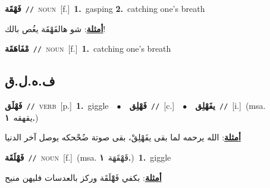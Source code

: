 \documentclass[10pt,a4paper,twoside]{article} %
\begin{document}
\begin{multicols}{2}
{\setlength\topsep{0pt}\textbf{\foreignlanguage{arabic}{فَهْقَة}}\ {\color{gray}\texttt{//}\color{black}}\ \textsc{noun}\ [f.]\ \textbf{1.}~gasping  \textbf{2.}~catching one's breath\  \begin{flushright}\color{gray}\foreignlanguage{arabic}{\textbf{\underline{\foreignlanguage{arabic}{أمثلة}}}: شو هالفَهْقَة يغُص بالك!}\end{flushright}\color{black}} \vspace{2mm}

{\setlength\topsep{0pt}\textbf{\foreignlanguage{arabic}{مْفَاهَقَة}}\ {\color{gray}\texttt{//}\color{black}}\ \textsc{noun}\ [f.]\ \textbf{1.}~catching one's breath\ } \vspace{2mm}

\vspace{-3mm}
\subsection*{\color{blue}\foreignlanguage{arabic}{ف.ه.ل.ق}\color{blue}{}} 

{\setlength\topsep{0pt}\textbf{\foreignlanguage{arabic}{فَهْلَق}}\ {\color{gray}\texttt{//}\color{black}}\ \textsc{verb}\ [p.]\ \textbf{1.}~giggle\ \ $\bullet$\ \ \setlength\topsep{0pt}\textbf{\foreignlanguage{arabic}{فَهْلِق}}\ {\color{gray}\texttt{//}\color{black}}\ [c.]\ \ $\bullet$\ \ \setlength\topsep{0pt}\textbf{\foreignlanguage{arabic}{يفَهْلِق}}\ {\color{gray}\texttt{//}\color{black}}\ [i.]\ \color{gray}(msa. \foreignlanguage{arabic}{يقهقه}~\foreignlanguage{arabic}{\textbf{١.}})\color{black}\  \begin{flushright}\color{gray}\foreignlanguage{arabic}{\textbf{\underline{\foreignlanguage{arabic}{أمثلة}}}: الله يرحمه لما بقى يفَهْلِقْ، بقى صوتة ضُحْحكه يوصل آخر الدنيا}\end{flushright}\color{black}} \vspace{2mm}

{\setlength\topsep{0pt}\textbf{\foreignlanguage{arabic}{فَهْلَقَة}}\ {\color{gray}\texttt{//}\color{black}}\ \textsc{noun}\ [f.]\ \color{gray}(msa. \foreignlanguage{arabic}{قَهْقَهَة}~\foreignlanguage{arabic}{\textbf{١.}})\color{black}\ \textbf{1.}~giggle\  \begin{flushright}\color{gray}\foreignlanguage{arabic}{\textbf{\underline{\foreignlanguage{arabic}{أمثلة}}}: بكفي فَهْْلَقَة وركز بالعدسات فليهن منيح}\end{flushright}\color{black}} \vspace{2mm}


\end{multicols}
\end{document}
